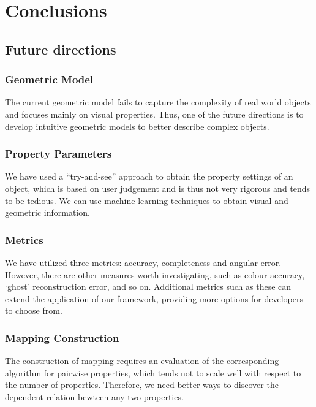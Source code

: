 
\chapter{Conclusions}
\label{sec:conclusion}



\section{Future directions}

\subsection{Geometric Model}
The current geometric model fails to capture the complexity of real world objects and focuses mainly on visual properties. Thus, one of the future directions is to develop intuitive geometric models to better describe complex objects.

\subsection{Property Parameters}
We have used a ``try-and-see'' approach to obtain the property settings of an object, which is based on user judgement and is thus not very rigorous and tends to be tedious. We can use machine learning techniques to obtain visual and geometric information.

\subsection{Metrics}
We have utilized three metrics: accuracy, completeness and angular error. However, there are other measures worth investigating, such as colour accuracy, `ghost' reconstruction error, and so on. Additional metrics such as these can extend the application of our framework, providing more options for developers to choose from.

\subsection{Mapping Construction}
The construction of mapping requires an evaluation of the corresponding algorithm for pairwise properties, which tends not to scale well with respect to the number of properties. Therefore, we need better ways to discover the dependent relation bewteen any two properties.

